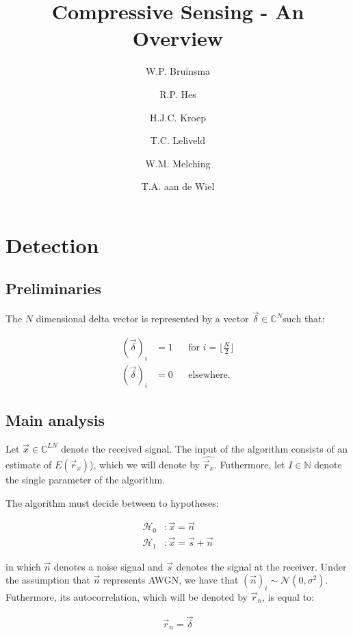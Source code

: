 \documentclass[a4paper, openany, oneside]{memoir}
\title{Compressive Sensing - An Overview}
\author{W.P. Bruinsma \and R.P. Hes \and H.J.C. Kroep \and T.C. Leliveld \and W.M. Melching \and T.A. aan de Wiel}
\begin{document}
\chapter{Detection}

\section{Preliminaries}

\begin{blockDefinition}
The $N$ dimensional delta vector is represented by a vector $\vec{\delta} \in \mathbb{C}^N$such that:

\begin{align*}
  (\vec{\delta})_i &= 1 &&\text{for $i = \lfloor \frac{N}{2} \rfloor$} \\ 
  (\vec{\delta})_i &= 0 &&\text{elsewhere.}
\end{align*}
\end{blockDefinition}

\section{Main analysis}

Let $\vec{x} \in \mathbb{C}^{LN}$ denote the received signal. The input of the algorithm consists of an estimate of $E(\vec{r}_x)$), which we will denote by $\hat{\vec{r}_x}$. Futhermore, let $I \in \mathbb{N}$ denote the single parameter of the algorithm.

The algorithm must decide between to hypotheses:

\begin{align}
  \mathcal{H}_0&: \vec{x} = \vec{n} \\
  \mathcal{H}_1&: \vec{x} = \vec{s} + \vec{n}
\end{align}

in which $\vec{n}$ denotes a noise signal and $\vec{s}$ denotes the signal
at the receiver. Under the assumption that $\vec{n}$ represents AWGN, we have that $(\vec{n})_i \sim \mathcal{N}(0, \sigma^2)$. Futhermore, its autocorrelation, which will be denoted by $\vec{r}_n$, is equal to:

\begin{align*}
  \vec{r}_n = \vec{\delta}
\end{align*}
\end{document}

